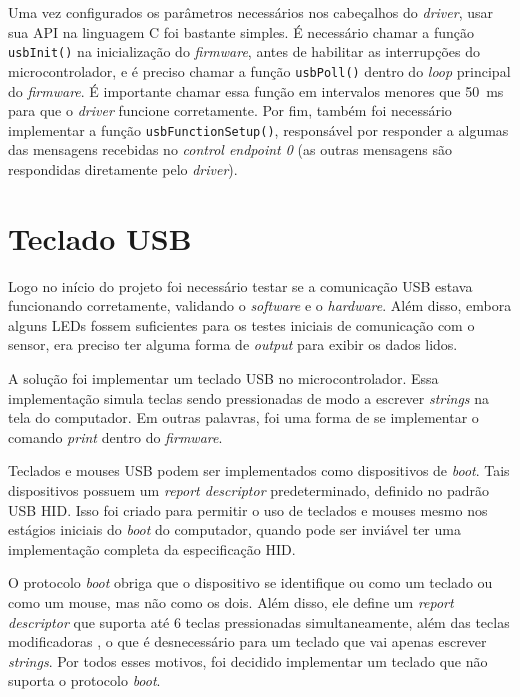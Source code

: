 \documentclass[brazil,pagestart=firstchapter]{abnt}
\begin{document}
Uma vez configurados os parâmetros necessários nos cabeçalhos do
\textit{driver}, usar sua \ac{API} na linguagem C foi bastante simples. É
necessário chamar a função \texttt{usbInit()} na inicialização do
\textit{firmware}, antes de habilitar as interrupções do microcontrolador, e
é preciso chamar a função \texttt{usbPoll()} dentro do \textit{loop}
principal do \textit{firmware}. É importante chamar essa função em
intervalos menores que \SI{50}{\milli\second} para que o \textit{driver}
funcione corretamente. Por fim, também foi necessário implementar a função
\texttt{usbFunctionSetup()}, responsável por responder a algumas das
mensagens recebidas no \textit{control endpoint 0} (as outras mensagens são
respondidas diretamente pelo \textit{driver}). \cite{WikiDotDriverApi}


\section{Teclado USB}
\label{sec:keyboard}

Logo no início do projeto foi necessário testar se a comunicação \ac{USB}
estava funcionando corretamente, validando o \textit{software} e o
\textit{hardware}. Além disso, embora alguns \acp{LED} fossem suficientes
para os testes iniciais de comunicação com o sensor, era preciso ter alguma
forma de \textit{output} para exibir os dados lidos.

A solução foi implementar um teclado \ac{USB} no microcontrolador. Essa
implementação simula teclas sendo pressionadas de modo a escrever
\textit{strings} na tela do computador. Em outras palavras, foi uma forma de
se implementar o comando \textit{print} dentro do \textit{firmware}.

Teclados e mouses \ac{USB} podem ser implementados como dispositivos de
\textit{boot}. Tais dispositivos possuem um \textit{report descriptor}
predeterminado, definido no padrão \ac{USB} \ac{HID}. Isso foi criado para
permitir o uso de teclados e mouses mesmo nos estágios iniciais do
\textit{boot} do computador, quando pode ser inviável ter uma implementação
completa da especificação \ac{HID}. \cite[p.~59]{usbhid}

O protocolo \textit{boot} obriga que o dispositivo se identifique ou como um
teclado ou como um mouse, mas não como os dois. \cite[p.~9]{usbhid} Além
disso, ele define um \textit{report descriptor} que suporta até 6 teclas
pressionadas simultaneamente, além das teclas modificadoras
\cite[p.~60]{usbhid}, o que é desnecessário para um
teclado que vai apenas escrever \textit{strings}. Por todos esses motivos,
foi decidido implementar um teclado que não suporta o protocolo
\textit{boot}.
\end{document}
